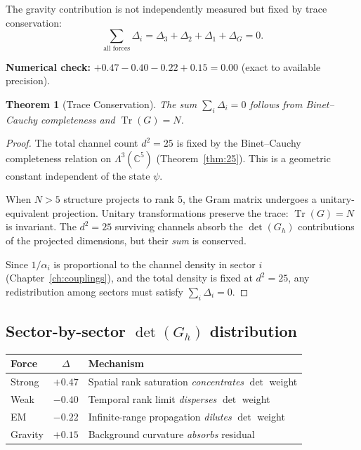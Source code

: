 \documentclass[12pt]{article}
\newtheorem{theorem}{Theorem}[section]
\theoremstyle{remark}
\theoremstyle{definition}
\begin{document}
The gravity contribution is not independently measured but fixed by trace conservation:
\begin{equation}
\boxed{\sum_{\text{all forces}} \Delta_i = \Delta_3 + \Delta_2 + \Delta_1 + \Delta_G = 0.}
\label{eq:ghost_sum}
\end{equation}

\textbf{Numerical check:} $+0.47 - 0.40 - 0.22 + 0.15 = 0.00$ (exact to available precision).

\begin{theorem}[Trace Conservation]
The sum $\sum_i \Delta_i = 0$ follows from Binet--Cauchy completeness and $\operatorname{Tr}(G) = N$.
\end{theorem}

\begin{proof}
The total channel count $d^2 = 25$ is fixed by the Binet--Cauchy completeness relation on $\Lambda^3(\mathbb{C}^5)$ (Theorem~\ref{thm:25}). This is a geometric constant independent of the state $\psi$.

When $N > 5$ structure projects to rank 5, the Gram matrix undergoes a unitary-equivalent projection. Unitary transformations preserve the trace: $\operatorname{Tr}(G) = N$ is invariant. The $d^2 = 25$ surviving channels absorb the $\det(G_h)$ contributions of the projected dimensions, but their \emph{sum} is conserved.

Since $1/\alpha_i$ is proportional to the channel density in sector $i$ (Chapter~\ref{ch:couplings}), and the total density is fixed at $d^2 = 25$, any redistribution among sectors must satisfy $\sum_i \Delta_i = 0$.
\end{proof}

\subsection{Sector-by-sector $\det(G_h)$ distribution}

\begin{center}
\begin{tabular}{lcl}
\hline
Force & $\Delta$ & Mechanism \\
\hline
Strong & $+0.47$ & Spatial rank saturation \emph{concentrates} $\det$ weight \\
Weak & $-0.40$ & Temporal rank limit \emph{disperses} $\det$ weight \\
EM & $-0.22$ & Infinite-range propagation \emph{dilutes} $\det$ weight \\
Gravity & $+0.15$ & Background curvature \emph{absorbs} residual \\
\hline
\end{tabular}
\end{center}
\end{document}

